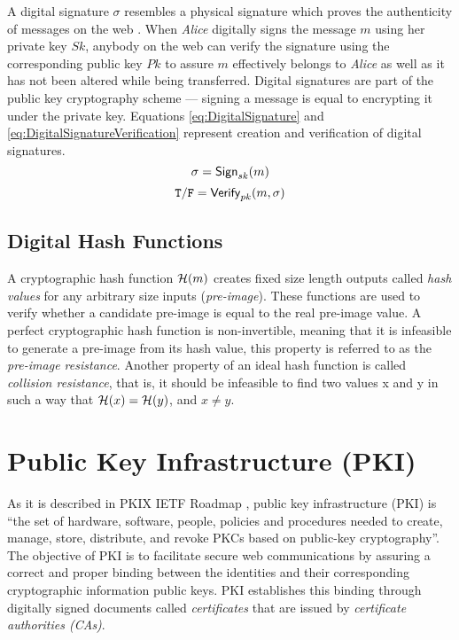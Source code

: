 A digital signature $\sigma$ resembles a physical signature which proves the authenticity of messages on the web \cite{pfleeger2002security}. When \emph{Alice} digitally signs the message $m$ using her private key $Sk$, anybody on the web can verify the signature using the corresponding public key $Pk$ to assure $m$ effectively belongs to \emph{Alice} as well as it has not been altered while being transferred. Digital signatures are part of the public key cryptography scheme --- signing a message is equal to encrypting it under the private key. Equations \ref{eq:DigitalSignature} and \ref{eq:DigitalSignatureVerification} represent creation and verification of digital signatures. 
\begin{equation} \label{eq:DigitalSignature}
\sigma=\mathsf{Sign}_{sk}(m)
\end{equation}
\begin{equation} \label{eq:DigitalSignatureVerification}
\mathtt{T/F}=\mathsf{Verify}_{pk}(m,\sigma)
 \end{equation}


\subsection{Digital Hash Functions}

A cryptographic hash function $\mathcal{H}(m)$ creates fixed size length outputs called \emph{hash values} for any arbitrary size inputs (\emph{pre-image})\cite{schneier2007applied}. These functions are used to verify whether a candidate pre-image is equal to the real pre-image value. A perfect cryptographic hash function is non-invertible, meaning that it is infeasible to generate a pre-image from its hash value, this property is referred to as the \emph{pre-image resistance}. Another property of an ideal hash function is called \emph{collision resistance}, that is, it should be infeasible to find two values x and y in such a way that $\mathcal{H}(x) = \mathcal{H}(y)$, and $x \neq y$.


\section{Public Key Infrastructure (PKI)}

As it is described in PKIX IETF Roadmap \cite{arsenault2002internet}, public key infrastructure (PKI) is ``the set of hardware, software, people, policies and procedures needed to create, manage, store, distribute, and revoke PKCs based on public-key cryptography''. The objective of PKI is to facilitate secure web communications by assuring a correct and proper binding between the identities and their corresponding cryptographic information \ie public keys. PKI establishes this binding through digitally signed documents called \emph{certificates} that are issued by \emph{certificate authorities (CAs)}.
 
